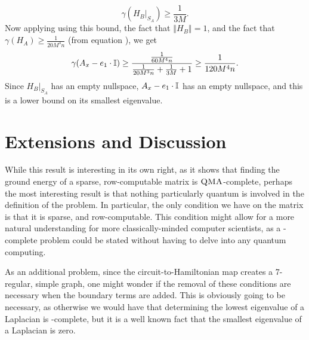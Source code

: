 \documentclass[../thesis-main/thesis-main]{subfiles}
\begin{document}
\begin{equation}
\gamma(H_{B}|_{S_{A}})\geq\frac{1}{3M}.
\end{equation}
Now applying  using this bound, the fact that $\left\Vert H_{B}\right\Vert =1$, and the fact that $\gamma(H_{A})\geq\frac{1}{20M^{3}n}$ (from equation ), we get 
\begin{equation}
\gamma(A_{x}-e_{1}\cdot\mathbb{I})\geq\frac{\frac{1}{60M^{4}n}}{\frac{1}{20M^{3}n}+\frac{1}{3M}+1}\geq\frac{1}{120M^{4}n}.
\end{equation}
Since $H_{B}|_{S_{A}}$ has an empty nullspace, $A_{x}-e_{1}\cdot\mathbb{I}$ has an empty nullspace, and this is a lower bound on its smallest eigenvalue.

\section{Extensions and Discussion}

While this result is interesting in its own right, as it shows that finding the ground energy of a sparse, row-computable matrix is $\textsc{QMA}$-complete, perhaps the most interesting result is that nothing particularly quantum is involved in the definition of the problem.  In particular, the only condition we have on the matrix is that it is sparse, and row-computable.  This condition might allow for a more natural understanding for more classically-minded computer scientists, as a \QMA-complete problem could be stated without having to delve into any quantum computing.

As an additional problem, since the circuit-to-Hamiltonian map creates a 7-regular, simple graph, one might wonder if the removal of these conditions are necessary when the boundary terms are added.  This is obviously going to be necessary, as otherwise we would have that determining the lowest eigenvalue of a Laplacian is \QMA-complete, but it is a well known fact that the smallest eigenvalue of a Laplacian is zero.  


\end{document}
